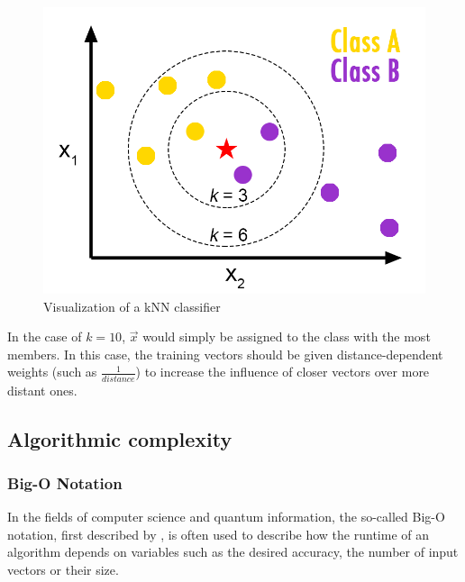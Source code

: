\begin{figure}[H]
      \centering
       \includegraphics[scale=0.55]{img/knn-concept.png}
       \caption[caption for kNN]{\label{fig:knnconcept} Visualization of a kNN classifier\footnotemark[4]}
\end{figure}


In the case of $k = 10$, $\vec{x}$ would simply be assigned to the class with the most members. In this case, the training vectors should be given distance-dependent weights (such as $\frac{1}{distance}$) to increase the influence of closer vectors over more distant ones.

\subsection{Algorithmic complexity}
\label{subsubsec:algcomplexity}

\subsubsection{Big-O Notation}
\label{subsubsubsec:bigO}

In the fields of computer science and quantum information, the so-called Big-O notation, first described by , is often used to describe how the runtime of an algorithm depends on variables such as the desired accuracy, the number of input vectors or their size.

